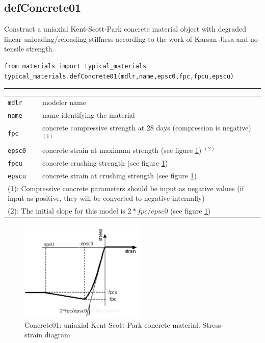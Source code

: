 \subsection{defConcrete01}
\noindent Construct a uniaxial Kent-Scott-Park concrete material object with degraded linear unloading/reloading stiffness according to the work of Karsan-Jirsa and no tensile strength.
\begin{verbatim}
from materials import typical_materials
typical_materials.defConcrete01(mdlr,name,epsc0,fpc,fpcu,epscu)
\end{verbatim}
\vspace{-10pt}
{\color{grayLines} \rule{\linewidth}{0.25pt}}
\begin{center}
\begin{tabular}{lp{10cm}}
{\tt mdlr} & modeler name \\
{\tt name} & name identifying the material \\
{\tt fpc} &  concrete compressive strength at 28 days (compression is negative) $^{(1)}$\\
{\tt epsc0} &  concrete strain at maximum strength (see figure \ref{Concrete01}) $^{(2)}$\\
{\tt fpcu} &  concrete crushing strength (see figure \ref{Concrete01}) \\
{\tt epscu} &  concrete strain at crushing strength (see figure \ref{Concrete01}) \\
\hline
\multicolumn{2}{p{12cm}}{\footnotesize(1): Compressive concrete parameters should be input as negative values (if input as positive, they will be converted to negative internally)}\\
\multicolumn{2}{p{12cm}}{\footnotesize (2): The initial slope for this model is $2*fpc/epsc0$ (see figure \ref{Concrete01})}\\
\end{tabular}
\end{center}

\begin{figure}[h]
\centering
\includegraphics[width=60mm]{materials/figures/Concrete01}
\caption{Concrete01: uniaxial Kent-Scott-Park concrete material. Stress-strain diagram}\label{Concrete01}
\end{figure}

